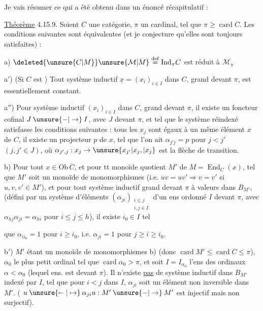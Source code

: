 Je vais résumer ce qui a été obtenu dans un énoncé récapitulatif :

\uline{Théorème} 4.15.9. Soient $C$ une  catégorie, $\pi$ un cardinal, tel que $\pi\geq\operatorname{card} C$. Les conditions suivantes sont équivalentes (et je conjecture qu'elles sont toujours satisfaites) :

a) $\deleted{\unsure{C|M}}\unsure{\mathcal M|M}\overset{\mathrm{def}}{=}\mathrm{Ind}_\pi C$ est réduit à $\mathcal M_\pi$

a$'$) (Si $C$ est ) Tout système inductif $\underline{x}=(x_i)_{i\in I}$ dans $C$, grand devant $\pi$, est essentiellement constant.

a$''$) Pour  système inductif $(x_i)_{i\in I}$ dans $C$, grand devant $\pi$, il existe un foncteur cofinal $J\mathbin{\unsure{-|\to}}I$, avec $J$   devant $\pi$, et tel que le système réindexé  satisfasse les
conditions suivantes :  tous les $x_j$ sont égaux à un même élément $x$ de $C$,  il existe un projecteur $p$ de $x$, tel que l'on ait $\alpha_{j'j}=p$ pour $j<j'$ $(j,j'\in J)$, où $\alpha_{j',j}:x_j\to\unsure{x_{j'}|x_j,|x_j}$ est la flèche de transition.

b) Pour tout $x\in\mathrm{Ob}\,C$, et pour tt monoïde quotient $M'$ de $M=\operatorname{End}_C(x)$, tel que $M'$ soit un monoïde de monomorphismes (i.e. $uv=uv'\Longrightarrow v=v'$ si $u,v,v'\in M'$), et pour tout système
inductif grand devant $\pi$ à valeurs dans $B_{M'}$, (défini par un système d'éléments $(\alpha_{ji})_{\substack{i\leq j\\i,j\in I}}$ d'un ens ordonné $I$  devant $\pi$, avec $\alpha_{hj}\alpha_{ji}=\alpha_{hi}$ pour $i\leq j\leq h$), il existe $i_0\in I$ tel

que $\alpha_{ii_0}=1$ pour $i\geq i_0$, i.e. $\alpha_{ji}=1$ pour $j\geq i\geq i_0$.

b$'$) $M'$ étant un monoïde de monomorphismes  b) (donc $\operatorname{card} M'\leq\operatorname{card} C\leq\pi$),   $\alpha_0$ le plus petit ordinal  tel que $\operatorname{card}\alpha_0>\pi$, et soit $I=I_{\alpha_0}$ l'ens  des ordinaux $\alpha<\alpha_0$ (lequel ens. est  devant $\pi$).
 Il n'existe \uline{pas} de système inductif dans $B_{M'}$ indexé par $I$, tel que  pour $i<j$ dans $I$, $\alpha_{ji}$ soit un élément non inversible dans $M'$.
( $u\mathbin{\unsure{\mapstochar\relbar|\mapsto}}\alpha_{ji}u:M'\mathbin{\unsure{-|\to}}M'$ est injectif mais non surjectif).

